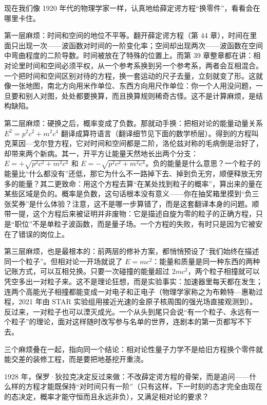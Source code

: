 
现在我们像 1920 年代的物理学家一样，认真地给薛定谔方程“换零件”，看看会在哪里卡住。

第一层麻烦：时间和空间的地位不平等。翻开薛定谔方程（第 44 章），时间在里面只出现一次——波函数对时间的一阶变化率；空间却出现两次——波函数在空间中弯曲程度的二阶导数。时间被放在了特殊的位置上。而第 39 章整章都在讲：相对论里时间和空间必须平权，从一个参考系换到另一个参考系，两者会互相混合。一个把时间和空间区别对待的方程，换一套运动的尺子去量，立刻就变了形。这就像一张地图，南北方向用米作单位、东西方向用尺作单位：你一个人用没问题，一旦要和别人对图，处处都要换算，而且换算规则稀奇古怪。这不是计算麻烦，是结构缺陷。

第二层麻烦：硬换之后，概率变成了负数。那就动手换：把相对论的能量动量关系 \(E^2=p^2c^2+m^2c^4\) 翻译成算符语言（翻译细节见下面的数学桥层）。得到的方程叫克莱因—戈尔登方程，它对时间和空间都是二阶，洛伦兹对称的毛病倒是治好了，却带来两个新病。其一，开平方让能量天然地长出两个分支：\(E=+\sqrt{p^2c^2+m^2c^4}\) 和 \(E=-\sqrt{p^2c^2+m^2c^4}\)。负的能量是什么意思？一个粒子的能量比“什么都没有”还低，那它为什么不一路掉下去、掉到负无穷，顺便释放无穷多的能量？其二更致命：用这个方程去算“在某处找到粒子的概率”，算出来的量在某些区域是负的。概率是负数，这句话根本没有意义——你在抽奖箱里摸到“负三张奖券”是什么体验？注意，这不是哪一步算错了，而是这套翻译本身的问题。顺带一提，这个方程后来被证明并非废物：它是描述自旋为零的粒子的正确方程，只是“职位”不是单粒子波函数，而是量子场。一个方程的失败，有时只是因为它被安在了错误的岗位上。

第三层麻烦，也是最根本的：前两层的修补方案，都悄悄预设了“我们始终在描述同一个粒子”。但相对论一开场就说了 \(E=mc^2\)：能量和质量是同一种东西的两种记账方式，可以互相兑换。只要一次碰撞的能量超过 \(2mc^2\)，两个粒子相撞就可以凭空多出一对粒子来。这不是理论狂想，而是实验事实：加速器里每天都在发生；连两个高能光子相撞都能变成一对电子和正电子（物理学家称之为布赖特—惠勒过程，2021 年由 STAR 实验组用接近光速的金原子核周围的强光场直接观测到）。反过来，一对粒子也可以湮灭成光。一个从头到尾只会说“有一个粒子、永远有一个粒子”的理论，面对这样随时改写参与名单的世界，连剧本的第一页都写不下去。

三个麻烦叠在一起，指向同一个结论：相对论性量子力学不是给旧方程换个零件就能交差的装修工程，而是要把地基挖开重浇。


1928 年，保罗·狄拉克决定反过来做：不改薛定谔方程的骨架，而是追问——什么样的方程才能既保持“对时间只有一阶”（只有这样，下一时刻的态才完全由现在的态决定，概率才能守恒而且永远非负），又满足相对论的要求？


